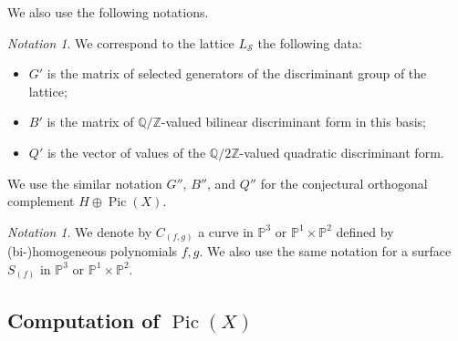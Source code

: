 \documentclass[10pt]{amsart}
\numberwithin{equation}{section}
\theoremstyle{plain}
\theoremstyle{definition}
\theoremstyle{remark}
\newtheorem{notation}[theorem]{Notation}
\DeclareMathOperator{\Pic}{Pic}
\begin{document}
We also use the following notations.

\begin{notation}
  We correspond to the lattice \(L_{\mathcal{S}}\) the following data:
  \begin{itemize}
  \item \(G'\) is the matrix of selected generators of the discriminant group of the lattice;
  \item \(B'\) is the matrix of \(\mathbb{Q} / \mathbb{Z}\)-valued bilinear discriminant form in this basis;
  \item \(Q'\) is the vector of values of the \(\mathbb{Q} / 2 \mathbb{Z}\)-valued quadratic discriminant form.
  \end{itemize}
  We use the similar notation \(G''\), \(B''\), and \(Q''\) for the conjectural orthogonal complement \(H \oplus \Pic(X)\).
\end{notation}

\begin{notation}
  We denote by \(C_{(f, g)}\) a curve in \(\mathbb{P}^3\) or \(\mathbb{P}^1 \times \mathbb{P}^2\) defined by (bi-)homogeneous polynomials \(f, g\). We also use the same notation for a surface \(S_{(f)}\) in \(\mathbb{P}^3\) or \(\mathbb{P}^1 \times \mathbb{P}^2\).
\end{notation}

\subsection{Computation of \texorpdfstring{\(\Pic(X)\)}{Pic(X)}}\label{subsection:L_X}
\end{document}
